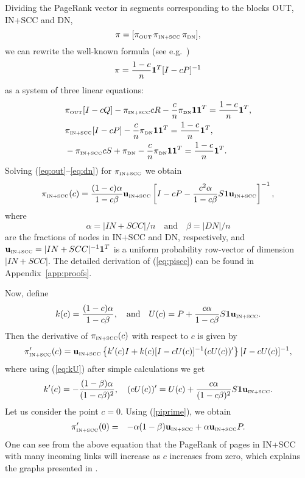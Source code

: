 \documentclass{article}
\newcommand{\one}{{\bf 1}}
\newcommand{\pidn}{\pi_{\mbox{\tiny DN}}}
\newcommand{\onedn}{{\bf 1}}
\newcommand{\piscc}{\pi_{\mbox{\tiny IN+SCC}}}
\newcommand{\scc}{{\mbox{\tiny IN+SCC}}}
\newcommand{\onescc}{{\bf 1}}
\newcommand{\piout}{\pi_{\mbox{\tiny OUT}}}
\newcommand{\oneout}{{\bf 1}}
\def\u{{{\bf u}_{\mbox{\tiny IN+SCC}}}}
\begin{document}
Dividing the PageRank vector in segments corresponding to the
blocks OUT, IN+SCC and DN,
\[ \pi=[\piout \, \piscc \, \pidn],\]
we can rewrite the well-known formula (see e.g.~\cite{Moler})
\begin{equation}
\label{eq:vector_eq} \pi=\frac{1-c}{n} \one^T [I-cP]^{-1}
\end{equation}
as a system of three linear equations:
\begin{align}
&\label{eq:out} \piout [I-cQ] -\piscc cR
-\frac{c}{n}\pidn\onedn\oneout^T = \frac{1-c}{n}\oneout^T,
\\
&\label{eq:scc} \piscc [I-cP]
-\frac{c}{n}\pidn\onedn\onescc^T = \frac{1-c}{n}\onescc^T,\\
&\label{eq:dn} -\piscc cS +\pidn -\frac{c}{n}\pidn\onedn\onedn^T =
\frac{1-c}{n}\onedn^T.
\end{align}
Solving (\ref{eq:out}--\ref{eq:dn}) for $\piscc$ we obtain
\begin{equation}
\label{eq:piscc} \piscc(c) =
\frac{(1-c)\alpha}{1-c\beta}\u\left[I-cP-\frac{c^2\alpha}{1-c\beta}S\onedn
\u\right]^{-1},
\end{equation}
where \[\alpha= |IN+SCC|/{n}\quad\mbox{and}\quad \beta=|DN|/{n}\]
are the fractions of nodes in IN+SCC and DN, respectively, and
$\u=|IN+SCC|^{-1}\onescc^T$ is a uniform probability row-vector of
dimension $|IN+SCC|$. The detailed derivation of (\ref{eq:piscc})
can be found in Appendix~\ref{app:proofs}.

Now, define
\begin{equation}
\label{eq:kU} k(c)=\frac{(1-c)\alpha}{1-c\beta}, \quad \mbox{and}
\quad U(c)=P+\frac{c\alpha}{1-c\beta}S\onedn \u.
\end{equation}
Then the derivative of $\piscc(c)$ with respect to $c$ is given by
\begin{eqnarray}
\label{piprime} \pi'_\scc(c) = \u\left\{k'(c)I +
k(c)[I-cU(c)]^{-1}(cU(c))'\right\}[I-cU(c)]^{-1},
\end{eqnarray}
where using (\ref{eq:kU}) after simple calculations we get
\[
k'(c)=-\frac{(1-\beta)\alpha}{(1-c\beta)^2},\quad
(cU(c))'=U(c)+\frac{c\alpha}{(1-c\beta)^2}S\onedn \u.
\]
Let us consider the point $c=0$. Using (\ref{piprime}), we obtain
\begin{eqnarray}
\label{eq:piscc'(0)}
\pi'_\scc(0) & = & -\alpha(1-\beta)\u +\alpha\u P.
\end{eqnarray}
One can see from the above equation that the PageRank of pages in
IN+SCC with many incoming links will increase as $c$ increases from
zero, which explains the graphs presented in \cite{Boldi05}.
\end{document}
